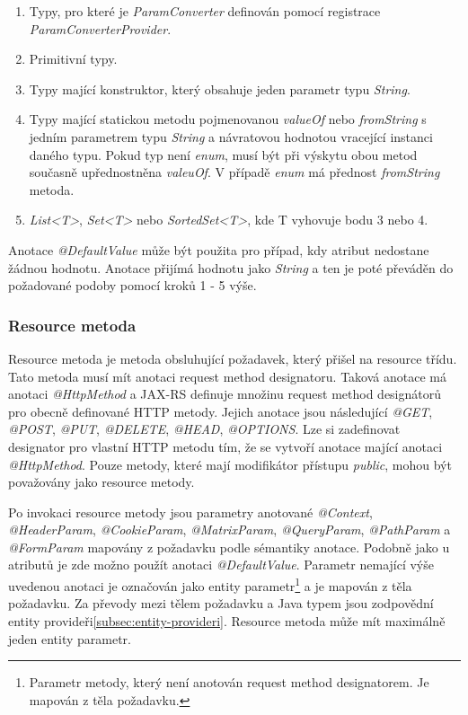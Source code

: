 \documentclass[11pt,twoside,a4paper]{book}
\begin{document}
\begin{enumerate}
  \item Typy, pro které je {\em ParamConverter} definován pomocí registrace
  {\em ParamConverterProvider}.
  \item Primitivní typy.
  \item Typy mající konstruktor, který obsahuje jeden parametr typu {\em
  String}.
  \item Typy mající statickou metodu pojmenovanou {\em valueOf} nebo {\em
  fromString} s jedním parametrem typu {\em String} a návratovou hodnotou
  vracející instanci daného typu. Pokud typ není {\em enum}, musí být při
  výskytu obou metod současně upřednostněna {\em valeuOf}. V případě {\em enum}
  má přednost {\em fromString} metoda.
  \item {\em List<T>}, {\em Set<T>} nebo {\em SortedSet<T>}, kde T vyhovuje bodu
  3 nebo 4.
\end{enumerate}

Anotace {\em @DefaultValue} může být použita pro případ, kdy atribut nedostane
žádnou hodnotu.
Anotace přijímá hodnotu jako {\em String} a ten je poté převáděn do požadované
podoby pomocí kroků 1 - 5 výše.

\subsubsection{Resource metoda}
\label{subsec:resource-metoda}

Resource metoda je metoda obsluhující požadavek, který přišel na resource třídu. Tato metoda
musí mít anotaci request method designatoru. Taková anotace má anotaci {\em
@HttpMethod} a JAX-RS definuje množinu request method designátorů pro obecně
definované HTTP metody.
Jejich anotace jsou následující {\em @GET}, {\em @POST}, {\em @PUT}, {\em
@DELETE}, {\em @HEAD}, {\em @OPTIONS}.
Lze si zadefinovat designator pro vlastní HTTP metodu tím, že se vytvoří anotace mající
anotaci {\em @HttpMethod}. Pouze metody, které mají modifikátor přístupu {\em
public}, mohou být považovány jako resource metody.

Po invokaci resource metody jsou parametry anotované {\em @Context}, {\em @HeaderParam},
{\em @CookieParam}, {\em @MatrixParam}, {\em @QueryParam}, {\em @PathParam} a {\em @FormParam} mapovány z
požadavku podle sémantiky anotace. Podobně jako u atributů je zde možno použít anotaci
{\em @DefaultValue}. Parametr nemající výše uvedenou anotaci je označován jako
entity parametr\footnote{Parametr metody, který není anotován request method
designatorem. Je mapován z těla požadavku.} a je mapován z těla požadavku.
Za převody mezi tělem požadavku a Java typem jsou zodpovědní entity
provideři\ref{subsec:entity-provideri}.
Resource metoda může mít maximálně jeden entity parametr.
\end{document}
